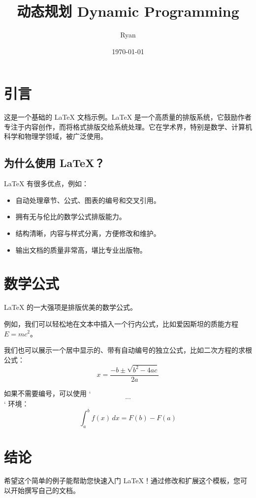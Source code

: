 \documentclass[a4paper,12pt]{article}
\title{动态规划 Dynamic Programming}
\author{Ryan}
\date{\today} %
\begin{document}
\maketitle

\section{引言}
这是一个基础的 \LaTeX{} 文档示例。\LaTeX{} 是一个高质量的排版系统，它鼓励作者专注于内容创作，而将格式排版交给系统处理。它在学术界，特别是数学、计算机科学和物理学领域，被广泛使用。

\subsection{为什么使用 \LaTeX{}？}
\LaTeX{} 有很多优点，例如：
\begin{itemize}
    \item 自动处理章节、公式、图表的编号和交叉引用。
    \item 拥有无与伦比的数学公式排版能力。
    \item 结构清晰，内容与样式分离，方便修改和维护。
    \item 输出文档的质量非常高，堪比专业出版物。
\end{itemize}

\section{数学公式}

\LaTeX{} 的一大强项是排版优美的数学公式。

例如，我们可以轻松地在文本中插入一个行内公式，比如爱因斯坦的质能方程 $E=mc^2$。

我们也可以展示一个居中显示的、带有自动编号的独立公式，比如二次方程的求根公式：
\begin{equation}
    x = \frac{-b \pm \sqrt{b^2 - 4ac}}{2a}
\end{equation}

如果不需要编号，可以使用 `\[ ... \]` 环境：
\[
    \int_{a}^{b} f(x) \,dx = F(b) - F(a)
\]

\section{结论}
希望这个简单的例子能帮助您快速入门 \LaTeX{}！通过修改和扩展这个模板，您可以开始撰写自己的文档。

\end{document}
